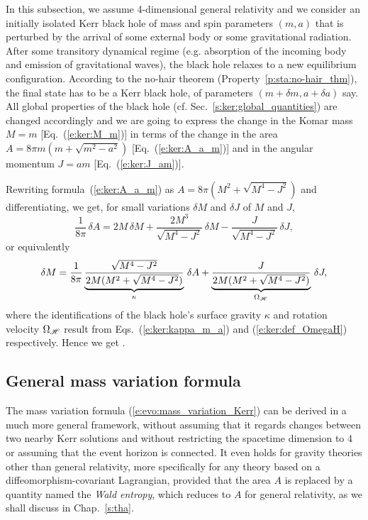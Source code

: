 In this subsection, we assume 4-dimensional general relativity and we
consider an initially isolated Kerr black hole of mass and spin parameters $(m,a)$
that is perturbed by the arrival of some external body or some gravitational
radiation. After some transitory dynamical regime (e.g. absorption of the
incoming body and emission of gravitational waves), the black hole relaxes
to a new equilibrium configuration. According to the
no-hair theorem (Property~\ref{p:sta:no-hair_thm}),
the final state has to be a Kerr black hole, of
parameters $(m+\delta m, a+\delta a)$ say. All global properties of the black
hole (cf. Sec.~\ref{s:ker:global_quantities})
are changed accordingly and we are going to express the change in
the Komar mass $M = m$ [Eq.~(\ref{e:ker:M_m})] in terms of the change in
the area $A = 8 \pi m (m + \sqrt{m^2-a^2})$ [Eq.~(\ref{e:ker:A_a_m})]
and in the angular momentum $J = a m$ [Eq.~(\ref{e:ker:J_am})].

Rewriting formula~(\ref{e:ker:A_a_m}) as $A = 8 \pi (M^2 + \sqrt{M^4 - J^2})$
and differentiating, we get, for small variations $\delta M$ and $\delta J$
of $M$ and $J$,
\[
\frac{1}{8\pi} \, \delta A =  2 M\,  \delta M + \frac{2M^3}{\sqrt{M^4-J^2}}\, \delta M
    - \frac{J}{\sqrt{M^4-J^2}}\, \delta J ,
\]
or equivalently
\[
    \delta M = \frac{1}{8\pi}
\underbrace{\frac{\sqrt{M^4-J^2}}{2M(M^2+\sqrt{M^4-J^2})}}_{\kappa} \, \delta A
+ \underbrace{\frac{J}{2M(M^2+\sqrt{M^4-J^2})}}_{\Omega_{\mathscr{H}}} \, \delta J  ,
\]
where the identifications of the black hole's surface gravity $\kappa$ and
rotation velocity $\Omega_{\mathscr{H}}$ result from Eqs.~(\ref{e:ker:kappa_m_a})
and (\ref{e:ker:def_OmegaH}) respectively. Hence we get
\be \label{e:evo:mass_variation_Kerr}
     .
\ee

\subsection{General mass variation formula} \label{s:evo:gen_mass_variation}

The mass variation formula (\ref{e:evo:mass_variation_Kerr}) can be derived in
a much more general framework, without assuming that it regards changes between
two nearby Kerr solutions and without restricting
the spacetime dimension to 4 or assuming that the event horizon is connected.
It even holds for gravity theories other than general relativity, more specifically
for any theory based on a diffeomorphism-covariant Lagrangian, provided that
the area $A$ is replaced by a quantity named the \emph{Wald entropy}, which reduces to $A$ for general relativity, as we shall discuss in Chap.~\ref{s:tha}.

